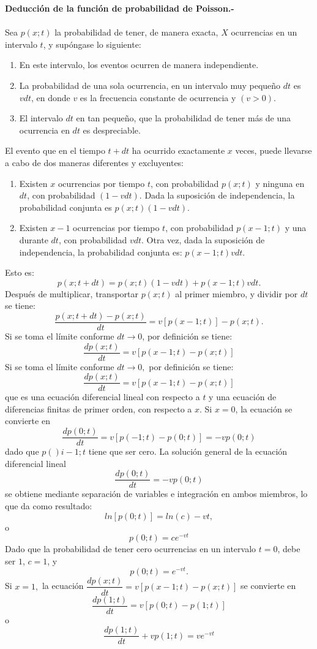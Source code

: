\textbf{Deducción de la función de probabilidad de Poisson.-}\\\\

Sea $p(x;t)$ la probabilidad de tener, de manera exacta, $X$ ocurrencias en un intervalo $t$, y supóngase lo siguiente:

\begin{enumerate}[\bfseries 1.]
    \item En este intervalo, los eventos ocurren de manera independiente.
    \item La probabilidad de una sola ocurrencia, en un intervalo muy pequeño $dt$ es $vdt$, en donde $v$ es la frecuencia constante de ocurrencia y $(v>0)$.
    \item El intervalo $dt$ en tan pequeño, que la probabilidad de tener más de una ocurrencia en $dt$ es despreciable.
\end{enumerate}

El evento que en el tiempo $t+dt$ ha ocurrido exactamente $x$ veces, puede llevarse a cabo de dos maneras diferentes y excluyentes:

\begin{enumerate}[\bfseries 1.]
    \item Existen $x$ ocurrencias por tiempo $t$, con probabilidad $p(x;t)$ y ninguna en $dt$, con probabilidad $(1-vdt)$. Dada la suposición de independencia, la probabilidad conjunta es $p(x;t)(1-vdt)$.
    \item Existen $x-1$ ocurrencias por tiempo $t$, con probabilidad $p(x-1;t)$ y una durante $dt$, con probabilidad $vdt$. Otra vez, dada la suposición de independencia, la probabilidad conjunta es: $p(x-1;t)vdt.$ 
\end{enumerate}
Esto es:
$$p(x;t+dt)=p(x;t)(1-vdt)+p(x-1;t)vdt.$$
Después de multiplicar, transportar $p(x;t)$ al primer miembro, y dividir por $dt$ se tiene:
$$\dfrac{p(x;t+dt)-p(x;t)}{dt}=v[p(x-1;t)]-p(x;t).$$
Si se toma el límite conforme $dt\to 0$, por definición se tiene:
$$\dfrac{dp(x;t)}{dt}=v[p(x-1;t)-p(x;t)]$$
 Si se toma el límite conforme $dt\to 0,$ por definición se tiene:
 $$\dfrac{dp(x;t)}{dt}=v\left[p(x-1;t)-p(x;t)\right]$$
 que es una ecuación diferencial lineal con respecto a $t$ y una ecuación de diferencias finitas de primer orden, con respecto a $x$. Si $x=0$, la ecuación se convierte en 
 $$\dfrac{dp(0;t)}{dt}=v\left[p(-1;t)-p(0;t)\right] = -vp(0;t)$$
 dado que $p()i-1;t$ tiene que ser cero. La solución general de la ecuación diferencial lineal 
 $$\dfrac{dp(0;t)}{dt}=-vp(0;t)$$
 se obtiene mediante separación de variables e integración en ambos miembros, lo que da como resultado:
 $$ln\left[p(0;t)\right]=ln(c)-vt,$$
 o
 $$p(0;t)=ce^{-vt}$$
 Dado que la probabilidad de tener cero ocurrencias en un intervalo $t=0$, debe ser $1$, $c=1$, y
 $$p(0;t)=e^{-vt}.$$
 Si $x=1,$ la ecuación  $\dfrac{dp(x;t)}{dt}=v[p(x-1;t)-p(x;t)]$ se convierte en
$$\dfrac{dp(1;t)}{dt}=v[p(0;t)-p(1;t)]$$
o
$$\dfrac{dp(1;t)}{dt}+vp(1;t) = ve^{-vt}$$

